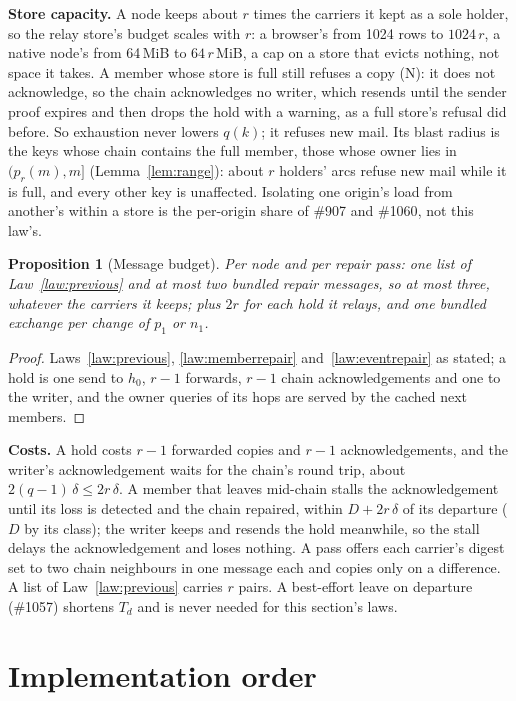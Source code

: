 \documentclass[journal]{IEEEtran}
\newtheorem{proposition}{Proposition}
\newcommand{\issue}[1]{\#{#1}}
\begin{document}
\textbf{Store capacity.}  A node keeps about $r$ times the carriers it kept as a sole holder,
so the relay store's budget scales with $r$: a browser's from 1024 rows to $1024\,r$, a native
node's from 64\,MiB to $64\,r$\,MiB, a cap on a store that evicts nothing, not space it takes.
A member whose store is full still refuses a copy (N): it does not acknowledge, so the chain
acknowledges no writer, which resends until the sender proof expires and then drops the hold
with a warning, as a full store's refusal did before.  So exhaustion never lowers $q(k)$; it
refuses new mail.  Its blast radius is the keys whose chain contains the full member, those
whose owner lies in $(p_r(m),m]$ (Lemma~\ref{lem:range}): about $r$ holders' arcs refuse new
mail while it is full, and every other key is unaffected.  Isolating one origin's load from
another's within a store is the per-origin share of \issue{907} and \issue{1060}, not this
law's.

\begin{proposition}[Message budget]\label{prop:budget}
Per node and per repair pass: one list of Law~\ref{law:previous} and at most two bundled repair
messages, so at most three, whatever the carriers it keeps; plus $2r$ for each hold it relays,
and one bundled exchange per change of $p_1$ or $n_1$.
\end{proposition}
\begin{proof}
Laws~\ref{law:previous}, \ref{law:memberrepair} and~\ref{law:eventrepair} as stated; a hold is
one send to $h_0$, $r-1$ forwards, $r-1$ chain acknowledgements and one to the writer, and the
owner queries of its hops are served by the cached next members.
\end{proof}

\textbf{Costs.}  A hold costs $r-1$ forwarded copies and $r-1$ acknowledgements, and the
writer's acknowledgement waits for the chain's round trip, about $2(q-1)\,\delta\le2r\,\delta$.
A member that leaves mid-chain stalls the acknowledgement until its loss is detected and the
chain repaired, within $D+2r\,\delta$ of its departure ($D$ by its class); the writer keeps and
resends the hold meanwhile, so the stall delays the acknowledgement and loses nothing.  A pass offers each carrier's
digest set to two chain neighbours in one message each and copies only on a difference.  A
list of
Law~\ref{law:previous} carries $r$ pairs.  A best-effort leave on departure (\issue{1057})
shortens $T_d$ and is never needed for this section's laws.

\section{Implementation order}\label{sec:plan}
\end{document}
